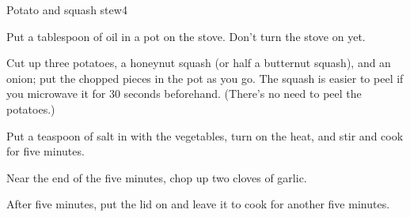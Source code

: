\documentclass{article}
\begin{document}
  \begin{recipe}{Potato and squash stew}{4}
    \begin{step}
      \begin{ingrs}
      \end{ingrs}
      \begin{stepdesc}
        Put a tablespoon of oil in a pot on the stove. Don't turn the stove on yet.
      \end{stepdesc}
    \end{step}
    \begin{step}
      \begin{ingrs}
      \end{ingrs}
      \begin{stepdesc}
        Cut up three potatoes, a honeynut squash (or half a butternut squash), and an onion; put the chopped pieces in the pot as you go. The squash is easier to peel if you microwave it for 30 seconds beforehand. (There's no need to peel the potatoes.)
      \end{stepdesc}
    \end{step}
    \begin{step}
      \begin{ingrs}
      \end{ingrs}
      \begin{stepdesc}
        Put a teaspoon of salt in with the vegetables, turn on the heat, and stir and cook for five minutes.
      \end{stepdesc}
    \end{step}
    \begin{step}
      \begin{ingrs}
      \end{ingrs}
      \begin{stepdesc}
        Near the end of the five minutes, chop up two cloves of garlic.
      \end{stepdesc}
    \end{step}
    \begin{step}
      \begin{ingrs}
      \end{ingrs}
      \begin{stepdesc}
        After five minutes, put the lid on and leave it to cook for another five minutes.

\end{stepdesc}
\end{step}
\end{recipe}
\end{document}
